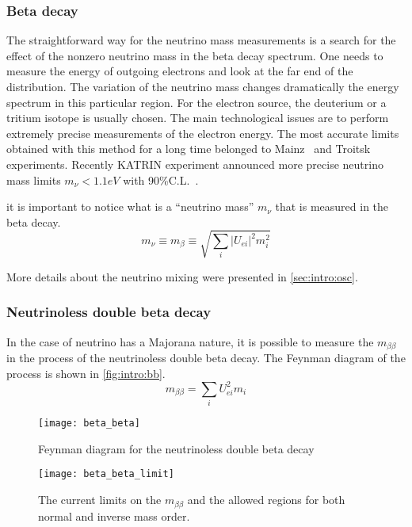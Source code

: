 \documentclass[../main.tex]{subfiles}
\begin{document}
\subsubsection{Beta decay}
The straightforward way for the neutrino mass measurements is a search for the effect of the nonzero neutrino mass in the beta decay spectrum. One needs to measure the energy of outgoing electrons and look at the far end of the distribution. The variation of the neutrino mass changes dramatically the energy spectrum in this particular region. For the electron source, the deuterium or a tritium isotope is usually chosen. The main technological issues are to perform extremely precise measurements of the electron energy. The most accurate limits obtained with this method for a long time belonged to Mainz~\cite{Kraus2005} and Troitsk~\cite{Aseev2011} experiments. Recently KATRIN experiment announced more precise neutrino mass limits $m_\nu < 1.1 eV$ with 90\%C.L.~\cite{Aker2019}.

it is important to notice what is a ``neutrino mass'' $m_\nu$ that is measured in the beta decay.
\begin{equation}
m_\nu\equiv m_\beta\equiv\sqrt{\sum_i\left|U_{ei}\right|^2m_i^2}
\end{equation}

More details about the neutrino mixing were presented in \autoref{sec:intro:osc}.

\subsubsection{Neutrinoless double beta decay}
In the case of neutrino has a Majorana nature, it is possible to measure the $m_{\beta\beta}$ in the process of the neutrinoless double beta decay. The Feynman diagram of the process is shown in \autoref{fig:intro:bb}.
\begin{equation}
m_{\beta\beta}=\sum_i U^2_{ei}m_i
\end{equation}

\begin{figure}
  \centering
  \begin{minipage}{0.49\linewidth}
    \texttt{[image: beta\_beta]}
    \caption{Feynman diagram for the neutrinoless double beta decay}
    \label{fig:intro:bb}
  \end{minipage}
  \begin{minipage}{0.49\linewidth}
    \texttt{[image: beta\_beta\_limit]}
    \caption{The current limits on the $m_{\beta\beta}$ and the allowed regions for both normal and inverse mass order.}
    \label{fig:intro:bb_lim}
  \end{minipage}
\end{figure}
\end{document}
